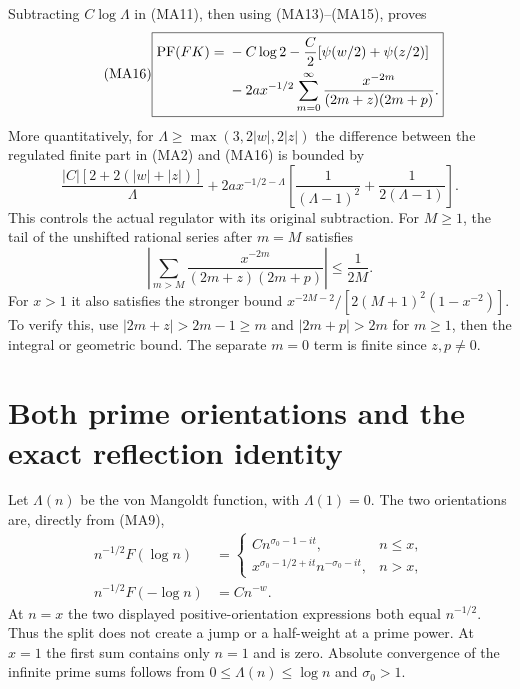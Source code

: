 Subtracting $C\log\Lambda$ in (MA11), then using (MA13)--(MA15), proves
\begin{equation}\tag{MA16}\boxed{\begin{aligned}
 \operatorname{PF}(FK)={}&-C\log2
 -\frac C2[\psi(w/2)+\psi(z/2)]\\
 &-2a x^{-1/2}\sum_{m=0}^\infty
       \frac{x^{-2m}}{(2m+z)(2m+p)}.
\end{aligned}}\end{equation}
More quantitatively, for
$\Lambda\ge\max(3,2|w|,2|z|)$ the difference between the regulated finite
part in (MA2) and (MA16) is bounded by
\begin{equation}\tag{MA17}
 \frac{|C|[2+2(|w|+|z|)]}{\Lambda}
 +2a x^{-1/2-\Lambda}
 \left[\frac1{(\Lambda-1)^2}+\frac1{2(\Lambda-1)}\right].
\end{equation}
This controls the actual regulator with its original subtraction.
For $M\ge1$, the tail of the unshifted rational series after $m=M$ satisfies
\begin{equation}\tag{MA18}
 \left|\sum_{m>M}\frac{x^{-2m}}{(2m+z)(2m+p)}\right|
 \le\frac1{2M}.
\end{equation}
For $x>1$ it also satisfies the stronger bound
$x^{-2M-2}/[2(M+1)^2(1-x^{-2})]$.
To verify this, use $|2m+z|>2m-1\ge m$ and $|2m+p|>2m$ for $m\ge1$,
then the integral or geometric bound. The separate $m=0$ term is finite
since $z,p\ne0$.

\section{Both prime orientations and the exact reflection identity}
Let $\Lambda(n)$ be the von Mangoldt function, with $\Lambda(1)=0$.
The two orientations are, directly from (MA9),
\begin{equation}\tag{MA19}\begin{aligned}
 n^{-1/2}F(\log n)
 &=\begin{cases}
 Cn^{\sigma_0-1-it},& n\le x,\\
 x^{\sigma_0-1/2+it}n^{-\sigma_0-it},& n>x,
 \end{cases}\\
 n^{-1/2}F(-\log n)&=Cn^{-w}.
\end{aligned}\end{equation}
At $n=x$ the two displayed positive-orientation expressions both equal
$n^{-1/2}$. Thus the split does not create a jump or a half-weight at
a prime power. At $x=1$ the first sum contains only $n=1$ and is zero.
Absolute convergence of the infinite prime sums follows from
$0\le\Lambda(n)\le\log n$ and $\sigma_0>1$.

